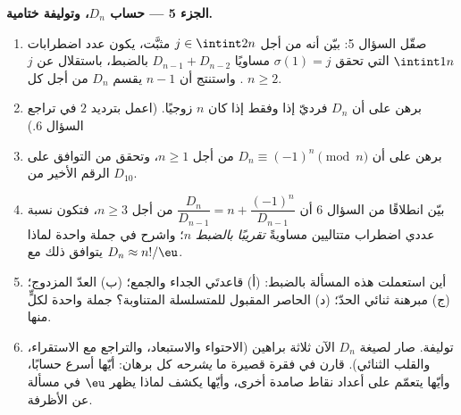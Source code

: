 \begin{problem}
\medskip
\noindent\textbf{الجزء 5 --- حساب $D_n$، وتوليفة ختامية.}
\begin{enumerate}[resume]
  \item صقّل السؤال 5: بيّن أنه من أجل $j \in
        \intint2n$ مثبَّت، يكون عدد اضطرابات $\intint1n$ التي تحقق
        $\sigma(1) = j$ مساويًا $D_{n-1} + D_{n-2}$ بالضبط،
        باستقلال عن $j$. واستنتج أن $n - 1$ يقسم $D_n$
        من أجل كل $n \geq 2$.
  \item برهن على أن $D_n$ فرديّ إذا وفقط إذا كان $n$ زوجيًا.
        (اعمل بترديد $2$ في تراجع السؤال 6.)
  \item برهن على أن $D_n \equiv (-1)^n \pmod n$ من أجل $n \geq 1$،
        وتحقق من التوافق على الرقم الأخير من $D_{10}$.
  \item بيّن انطلاقًا من السؤال 6 أن $\dfrac{D_n}{D_{n-1}} = n +
        \dfrac{(-1)^n}{D_{n-1}}$ من أجل $n \geq 3$، فتكون نسبة
        عددي اضطراب متتاليين مساويةً \emph{تقريبًا بالضبط}
        $n$؛ واشرح في جملة واحدة لماذا يتوافق ذلك مع
        $D_n \approx n!/\eu$.
  \item أين استعملت هذه المسألة بالضبط: (أ) قاعدتَي الجداء
        والجمع؛ (ب) العدّ المزدوج؛ (ج) مبرهنة ثنائي
        الحدّ؛ (د) الحاصر المقبول للمتسلسلة المتناوبة؟ جملة
        واحدة لكلٍّ منها.
  \item توليفة. صار لصيغة $D_n$ الآن ثلاثة براهين
        (الاحتواء والاستبعاد، والتراجع مع الاستقراء، والقلب
        الثنائي). قارن في فقرة قصيرة ما \emph{يشرحه} كل برهان:
        أيّها أسرع حسابًا، وأيّها يتعمّم على أعداد نقاط صامدة
        أخرى، وأيّها يكشف لماذا يظهر $\eu$ في مسألة عن الأظرفة.
\end{enumerate}
\end{problem}
